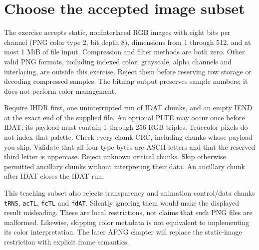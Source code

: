 \section{Choose the accepted image subset}
The exercise accepts static, noninterlaced RGB images with eight bits per channel
(PNG color type 2, bit depth 8), dimensions from 1 through 512, and at most 1 MiB of
file input. Compression and filter methods are both zero. Other valid PNG formats,
including indexed color, grayscale, alpha channels and interlacing, are outside this
exercise. Reject them before reserving row storage or decoding compressed samples.
The bitmap output preserves sample numbers; it does not perform color management.

Require IHDR first, one uninterrupted run of IDAT chunks, and an empty IEND at the
exact end of the supplied file. An optional PLTE may occur once before IDAT; its
payload must contain 1 through 256 RGB triples. Truecolor pixels do not index that
palette. Check every chunk CRC, including chunks whose payload you skip. Validate
that all four type bytes are ASCII letters and that the reserved third letter is
uppercase. Reject unknown critical chunks. Skip otherwise permitted ancillary chunks
without interpreting their data. An ancillary chunk after IDAT closes the IDAT run.

This teaching subset also rejects transparency and animation control/data chunks
\texttt{tRNS}, \texttt{acTL}, \texttt{fcTL} and \texttt{fdAT}. Silently ignoring them
would make the displayed result misleading. These are local restrictions, not claims
that such PNG files are malformed. Likewise, skipping color metadata is not equivalent
to implementing its color interpretation. The later APNG chapter will replace the
static-image restriction with explicit frame semantics.

